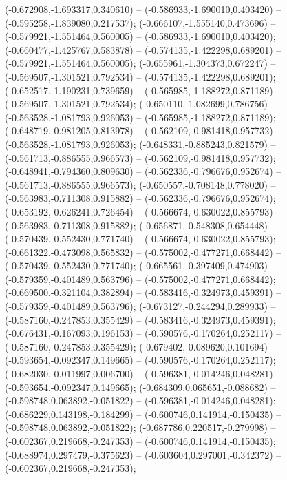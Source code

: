  (-0.672908,-1.693317,0.340610) -- (-0.586933,-1.690010,0.403420) -- (-0.595258,-1.839080,0.217537);
 (-0.666107,-1.555140,0.473696) -- (-0.579921,-1.551464,0.560005) -- (-0.586933,-1.690010,0.403420);
 (-0.660477,-1.425767,0.583878) -- (-0.574135,-1.422298,0.689201) -- (-0.579921,-1.551464,0.560005);
 (-0.655961,-1.304373,0.672247) -- (-0.569507,-1.301521,0.792534) -- (-0.574135,-1.422298,0.689201);
 (-0.652517,-1.190231,0.739659) -- (-0.565985,-1.188272,0.871189) -- (-0.569507,-1.301521,0.792534);
 (-0.650110,-1.082699,0.786756) -- (-0.563528,-1.081793,0.926053) -- (-0.565985,-1.188272,0.871189);
 (-0.648719,-0.981205,0.813978) -- (-0.562109,-0.981418,0.957732) -- (-0.563528,-1.081793,0.926053);
 (-0.648331,-0.885243,0.821579) -- (-0.561713,-0.886555,0.966573) -- (-0.562109,-0.981418,0.957732);
 (-0.648941,-0.794360,0.809630) -- (-0.562336,-0.796676,0.952674) -- (-0.561713,-0.886555,0.966573);
 (-0.650557,-0.708148,0.778020) -- (-0.563983,-0.711308,0.915882) -- (-0.562336,-0.796676,0.952674);
 (-0.653192,-0.626241,0.726454) -- (-0.566674,-0.630022,0.855793) -- (-0.563983,-0.711308,0.915882);
 (-0.656871,-0.548308,0.654448) -- (-0.570439,-0.552430,0.771740) -- (-0.566674,-0.630022,0.855793);
 (-0.661322,-0.473098,0.565832) -- (-0.575002,-0.477271,0.668442) -- (-0.570439,-0.552430,0.771740);
 (-0.665561,-0.397409,0.474903) -- (-0.579359,-0.401489,0.563796) -- (-0.575002,-0.477271,0.668442);
 (-0.669500,-0.321104,0.382894) -- (-0.583416,-0.324973,0.459391) -- (-0.579359,-0.401489,0.563796);
 (-0.673127,-0.244294,0.289933) -- (-0.587160,-0.247853,0.355429) -- (-0.583416,-0.324973,0.459391);
 (-0.676431,-0.167093,0.196153) -- (-0.590576,-0.170264,0.252117) -- (-0.587160,-0.247853,0.355429);
 (-0.679402,-0.089620,0.101694) -- (-0.593654,-0.092347,0.149665) -- (-0.590576,-0.170264,0.252117);
 (-0.682030,-0.011997,0.006700) -- (-0.596381,-0.014246,0.048281) -- (-0.593654,-0.092347,0.149665);
 (-0.684309,0.065651,-0.088682) -- (-0.598748,0.063892,-0.051822) -- (-0.596381,-0.014246,0.048281);
 (-0.686229,0.143198,-0.184299) -- (-0.600746,0.141914,-0.150435) -- (-0.598748,0.063892,-0.051822);
 (-0.687786,0.220517,-0.279998) -- (-0.602367,0.219668,-0.247353) -- (-0.600746,0.141914,-0.150435);
 (-0.688974,0.297479,-0.375623) -- (-0.603604,0.297001,-0.342372) -- (-0.602367,0.219668,-0.247353);
